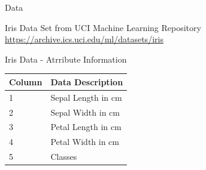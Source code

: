 \documentclass[ignorenonframetext,]{beamer}
\begin{document}
\begin{frame}{Data}

Iris Data Set from UCI Machine Learning Repository
\url{https://archive.ics.uci.edu/ml/datasets/iris}

\end{frame}

\begin{frame}{Iris Data - Atrribute Information}

\begin{longtable}[]{@{}ll@{}}
\toprule
\begin{minipage}[b]{0.12\columnwidth}\raggedright\strut
Column\strut
\end{minipage} & \begin{minipage}[b]{0.30\columnwidth}\raggedright\strut
Data Description\strut
\end{minipage}\tabularnewline
\midrule
\endhead
\begin{minipage}[t]{0.12\columnwidth}\raggedright\strut
1\strut
\end{minipage} & \begin{minipage}[t]{0.30\columnwidth}\raggedright\strut
Sepal Length in cm\strut
\end{minipage}\tabularnewline
\begin{minipage}[t]{0.12\columnwidth}\raggedright\strut
2\strut
\end{minipage} & \begin{minipage}[t]{0.30\columnwidth}\raggedright\strut
Sepal Width in cm\strut
\end{minipage}\tabularnewline
\begin{minipage}[t]{0.12\columnwidth}\raggedright\strut
3\strut
\end{minipage} & \begin{minipage}[t]{0.30\columnwidth}\raggedright\strut
Petal Length in cm\strut
\end{minipage}\tabularnewline
\begin{minipage}[t]{0.12\columnwidth}\raggedright\strut
4\strut
\end{minipage} & \begin{minipage}[t]{0.30\columnwidth}\raggedright\strut
Petal Width in cm\strut
\end{minipage}\tabularnewline
\begin{minipage}[t]{0.12\columnwidth}\raggedright\strut
5\strut
\end{minipage} & \begin{minipage}[t]{0.30\columnwidth}\raggedright\strut
Classes\strut
\end{minipage}\tabularnewline
\bottomrule
\end{longtable}

\end{frame}
\end{document}
